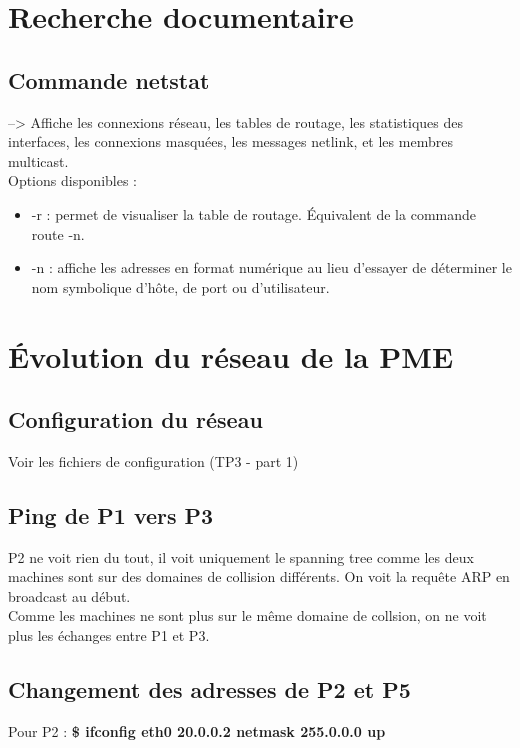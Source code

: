 \documentclass[a4paper]{article}
\begin{document}
	\section{Recherche documentaire}
		\subsection{Commande netstat}
\noindent
--> Affiche les connexions réseau, les tables de routage, les statistiques des interfaces, les connexions masquées, les messages netlink, et les membres multicast. \\

Options disponibles : \\
\begin{itemize}
	\item -r : permet de visualiser la table de routage. Équivalent de la commande route -n. \\
	\item -n : affiche les adresses en format numérique au lieu d'essayer de déterminer le nom symbolique d'hôte, de port ou d'utilisateur. \\
\end{itemize}


	\section{Évolution du réseau de la PME}
		\subsection{Configuration du réseau} 
Voir les fichiers de configuration (TP3 - part 1)

		\subsection{Ping de P1 vers P3}
P2 ne voit rien du tout, il voit uniquement le spanning tree comme les deux machines sont sur des domaines de collision différents. On voit la requête ARP en broadcast au début. \\
Comme les machines ne sont plus sur le même domaine de collsion, on ne voit plus les échanges entre P1 et P3. 


		\subsection{Changement des adresses de P2 et P5}
Pour P2 : \textbf{\$ ifconfig eth0 20.0.0.2 netmask 255.0.0.0 up} \\
\end{document}
